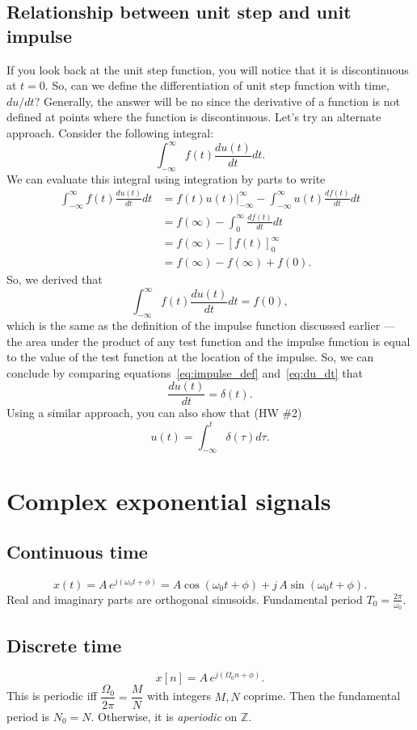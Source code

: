 \documentclass{ee102_notes}
\begin{document}
\subsection{Relationship between unit step and unit impulse}
If you look back at the unit step function, you will notice that it is discontinuous at $t = 0$. So, can we define the differentiation of unit step function with time, $du/dt$? Generally, the answer will be no since the derivative of a function is not defined at points where the function is discontinuous. Let's try an alternate approach. Consider the following integral:
\[
\int_{-\infty}^{\infty} f(t)\frac{du(t)}{dt}  dt.
\]
We can evaluate this integral using integration by parts to write
\begin{align*}
\int_{-\infty}^{\infty} f(t)\frac{du(t)}{dt}  dt &= f(t)u(t)\big|_{-\infty}^{\infty} - \int_{-\infty}^{\infty} u(t) \frac{df(t)}{dt} dt\\
&= f(\infty) - \int_{0}^{\infty} \frac{df(t)}{dt} dt\\
&= f(\infty) - [f(t)]_{0}^{\infty}\\
&= f(\infty) - f(\infty) + f(0).
\end{align*}
So, we derived that 
\begin{equation}
    \label{eq:du_dt}
    \int_{-\infty}^{\infty} f(t)\frac{du(t)}{dt}  dt = f(0),
\end{equation}
which is the same as the definition of the impulse function discussed earlier --- the area under the product of any test function and the impulse function is equal to the value of the test function at the location of the impulse. So, we can conclude by comparing equations~\eqref{eq:impulse_def} and~\eqref{eq:du_dt} that 
\[
\frac{du(t)}{dt} = \delta(t).
\]
Using a similar approach, you can also show that (HW \#2)
\[
u(t) = \int_{-\infty}^{t} \delta(\tau) d\tau.
\]
\section{Complex exponential signals}
\subsection*{Continuous time}
\[
x(t)=A\,e^{j(\omega_0 t+\phi)}=A\cos(\omega_0 t+\phi)+j\,A\sin(\omega_0 t+\phi).
\]
Real and imaginary parts are orthogonal sinusoids. Fundamental period $T_0=\frac{2\pi}{\omega_0}$.

\subsection*{Discrete time}
\[
x[n]=A\,e^{j(\Omega_0 n+\phi)}.
\]
This is periodic iff $\dfrac{\Omega_0}{2\pi}=\dfrac{M}{N}$ with integers $M,N$ coprime. Then the fundamental period is $N_0=N$. Otherwise, it is \emph{aperiodic} on $\mathbb{Z}$.
\end{document}

